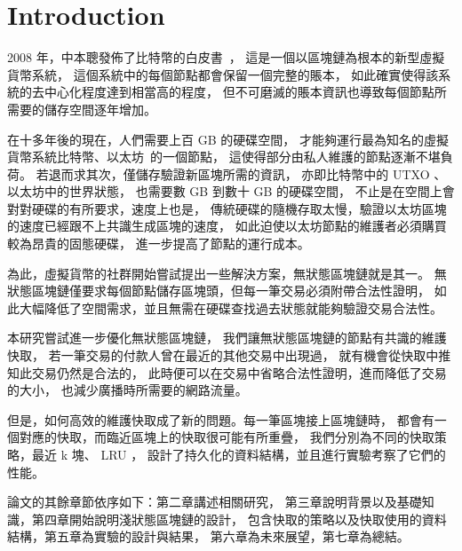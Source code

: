 \chapter{Introduction}
\label{c:intro}

2008 年，中本聰發佈了比特幣的白皮書~\cite{nakamoto2019bitcoin}，
這是一個以區塊鏈為根本的新型虛擬貨幣系統，
這個系統中的每個節點都會保留一個完整的賬本，
如此確實使得該系統的去中心化程度達到相當高的程度，
但不可磨滅的賬本資訊也導致每個節點所需要的儲存空間逐年增加。

在十多年後的現在，人們需要上百 GB 的硬碟空間，
才能夠運行最為知名的虛擬貨幣系統比特幣、以太坊~\cite{wood2014ethereum}的一個節點，
這使得部分由私人維護的節點逐漸不堪負荷。
若退而求其次，僅儲存驗證新區塊所需的資訊，
亦即比特幣中的 UTXO 、以太坊中的世界狀態，
也需要數 GB 到數十 GB 的硬碟空間，
不止是在空間上會對對硬碟的有所要求，速度上也是，
傳統硬碟的隨機存取太慢，驗證以太坊區塊的速度已經跟不上共識生成區塊的速度，
如此迫使以太坊節點的維護者必須購買較為昂貴的固態硬碟，
進一步提高了節點的運行成本。

為此，虛擬貨幣的社群開始嘗試提出一些解決方案，無狀態區塊鏈就是其一。
無狀態區塊鏈僅要求每個節點儲存區塊頭，但每一筆交易必須附帶合法性證明，
如此大幅降低了空間需求，並且無需在硬碟查找過去狀態就能夠驗證交易合法性。

本研究嘗試進一步優化無狀態區塊鏈，
我們讓無狀態區塊鏈的節點有共識的維護快取，
若一筆交易的付款人曾在最近的其他交易中出現過，
就有機會從快取中推知此交易仍然是合法的，
此時便可以在交易中省略合法性證明，進而降低了交易的大小，
也減少廣播時所需要的網路流量。

但是，如何高效的維護快取成了新的問題。每一筆區塊接上區塊鏈時，
都會有一個對應的快取，而臨近區塊上的快取很可能有所重疊，
我們分別為不同的快取策略，最近 k 塊、 LRU ，
設計了持久化的資料結構，並且進行實驗考察了它們的性能。

論文的其餘章節依序如下：第二章講述相關研究，
第三章說明背景以及基礎知識，第四章開始說明淺狀態區塊鏈的設計，
包含快取的策略以及快取使用的資料結構，第五章為實驗的設計與結果，
第六章為未來展望，第七章為總結。